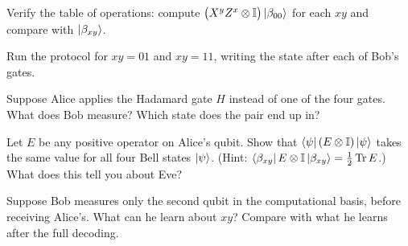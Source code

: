 \begin{exerciseset}
   Verify the table of operations: compute $\bigl(X^yZ^x\otimes\mathbb{I}\bigr)\left|\beta_{00}\right\rangle$ for each $xy$ and compare with $\left|\beta_{xy}\right\rangle$.

   Run the protocol for $xy=01$ and $xy=11$, writing the state after each of Bob's gates.

   Suppose Alice applies the Hadamard gate $H$ instead of one of the four gates. What does Bob measure? Which state does the pair end up in?

   Let $E$ be any positive operator on Alice's qubit. Show that $\left\langle\psi\right|(E\otimes\mathbb{I})\left|\psi\right\rangle$ takes the same value for all four Bell states $\left|\psi\right\rangle$. (Hint: $\left\langle\beta_{xy}\right|E\otimes\mathbb{I}\left|\beta_{xy}\right\rangle=\tfrac12\operatorname{Tr} E$.) What does this tell you about Eve?

   Suppose Bob measures only the second qubit in the computational basis, before receiving Alice's. What can he learn about $xy$? Compare with what he learns after the full decoding.
\end{exerciseset}
